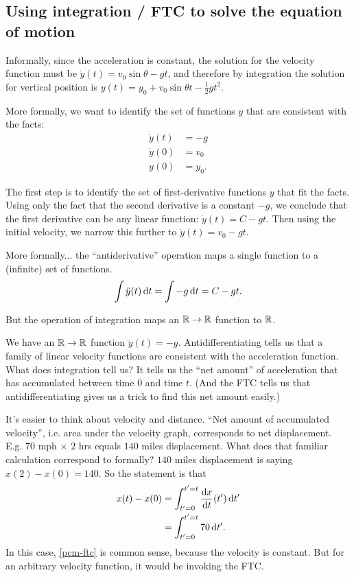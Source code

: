 \subsection{Using integration / FTC to solve the equation of motion}
Informally, since the acceleration is constant, the solution for the velocity function must be
$\dot{y}(t) = v_0\sin\theta - gt$, and therefore by integration the solution for vertical
position is $y(t) = y_0 + v_0\sin\theta t -\frac{1}{2}gt^2$.

More formally, we want to identify the set of functions $y$ that are consistent with the facts:
\begin{align*}
  \ddot{y}(t) &= -g \\
  \dot{y}(0)  &= v_0 \\
  y(0)        &= y_0.
\end{align*}

The first step is to identify the set of first-derivative functions $\dot{y}$ that fit the
facts. Using only the fact that the second derivative is a constant $-g$, we conclude that the
first derivative can be any linear function: $\dot{y}(t) = C - gt$. Then using the initial
velocity, we narrow this further to $\dot{y}(t) = v_0 - gt$.

More formally... the ``antiderivative'' operation maps a single function to a (infinite) set of
functions.
\begin{align*}
  \int \ddot{y}(t) \dt = \int -g \dt = C - gt.
\end{align*}

But the operation of integration maps an $\mathbb{R} \to \mathbb{R}$ function to $\mathbb{R}$.

We have an $\mathbb{R} \to \mathbb{R}$ function $\ddot{y}(t) = -g$. Antidifferentiating tells us that a family of
linear velocity functions are consistent with the acceleration function. What does integration
tell us? It tells us the ``net amount'' of acceleration that has accumulated between time $0$ and
time $t$. (And the FTC tells us that antidifferentiating gives us a trick to find this net amount
easily.)

It's easier to think about velocity and distance. ``Net amount of accumulated velocity'',
i.e. area under the velocity graph, corresponds to net displacement. E.g. $70$ mph $\times$ $2$
hrs equals $140$ miles displacement. What does that familiar calculation correspond to formally?
$140$ miles displacement is saying $x(2) - x(0) = 140$. So the statement is that
\begin{align}
    x(t) - x(0) &= \int_{t'=0}^{t'=t} \dxdt(t') \dt' \label{pcm-ftc} \\
                &= \int_{t'=0}^{t'=t} 70 \dt'.       \nonumber
\end{align}
In this case, \eqref{pcm-ftc} is common sense, because the velocity is constant. But for an
arbitrary velocity function, it would be invoking the FTC.

